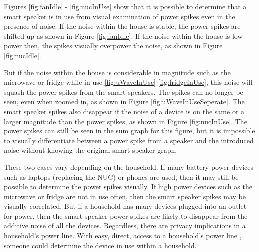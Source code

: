 Figures \ref{fig:fanIdle} - \ref{fig:nucInUse} show that it is possible to determine that a smart speaker is in use from visual examination of power spikes even in the presence of noise. If the noise within the house is stable, the power spikes are shifted up as shown in Figure \ref{fig:fanIdle}. If the noise within the house is low power then, the spikes visually overpower the noise, as shown in Figure \ref{fig:nucIdle}.

But if the noise within the house is considerable in magnitude such as the microwave or fridge while in use \ref{fig:uWaveInUse} \ref{fig:fridgeInUse}, this noise will squash the power spikes from the smart speakers. The spikes can no longer be seen, even when zoomed in, as shown in Figure \ref{fig:uWaveInUseSeperate}. The smart speaker spikes also disappear if the noise of a device is on the same or a larger magnitude than the power spikes, as shown in Figure \ref{fig:nucInUse}. The power spikes can still be seen in the sum graph for this figure, but it is impossible to visually differentiate between a power spike from a speaker and the introduced noise without knowing the original smart speaker graph.

These two cases vary depending on the household. If many battery power devices such as laptops (replacing the NUC) or phones are used, then it may still be possible to determine the power spikes visually. If high power devices such as the microwave or fridge are not in use often, then the smart speaker spikes may be visually correlated. But if a household has many devices plugged into an outlet for power, then the smart speaker power spikes are likely to disappear from the additive noise of all the devices. Regardless, there are privacy implications in a household's power line. With easy, direct, access to a household's power line \cite{griffith_2017}, someone could determine the device in use within a household.